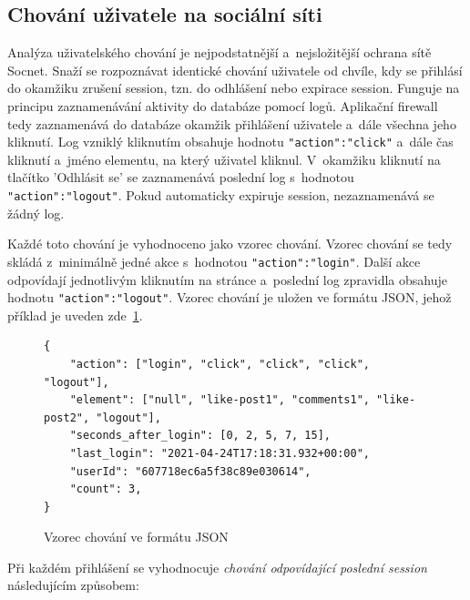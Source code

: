 \subsection*{Chování uživatele na sociální síti}
\label{sec:identical_behaviour}
Analýza uživatelského chování je nejpodstatnější a~nejsložitější ochrana sítě Socnet. Snaží se rozpoznávat identické chování uživatele od chvíle, kdy se přihlásí do okamžiku zrušení session, tzn. do odhlášení nebo expirace session. Funguje na principu zaznamenávání aktivity do databáze pomocí logů. Aplikační firewall tedy zaznamenává do databáze okamžik přihlášení uživatele a~dále všechna jeho kliknutí. Log vzniklý kliknutím obsahuje hodnotu \texttt{"action":"click"} a~dále čas kliknutí a~jméno elementu, na který uživatel kliknul. V~okamžiku kliknutí na tlačítko 'Odhlásit se' se zaznamenává poslední log s~hodnotou \texttt{"action":"logout"}. Pokud automaticky expiruje session, nezaznamenává se žádný log.

Každé toto chování je vyhodnoceno jako vzorec chování. Vzorec chování se tedy skládá z~minimálně jedné akce s~hodnotou \texttt{"action":"login"}. Další akce odpovídají jednotlivým kliknutím na stránce a~poslední log zpravidla obsahuje hodnotu \texttt{"action":"logout"}. Vzorec chování je uložen ve formátu JSON, jehož příklad je uveden zde~\ref{json:behaviour_pattern}. 

\begin{figure}[H]
    \centering
    \begin{verbatim}
{   
    "action": ["login", "click", "click", "click", "logout"],
    "element": ["null", "like-post1", "comments1", "like-post2", "logout"],
    "seconds_after_login": [0, 2, 5, 7, 15],
    "last_login": "2021-04-24T17:18:31.932+00:00",
    "userId": "607718ec6a5f38c89e030614",
    "count": 3,
}
    \end{verbatim}
    \caption{Vzorec chování ve formátu JSON}
    \label{json:behaviour_pattern}
\end{figure}
\bigskip

\noindent
Při každém přihlášení se vyhodnocuje \textit{chování odpovídající poslední session} následujícím způsobem:

